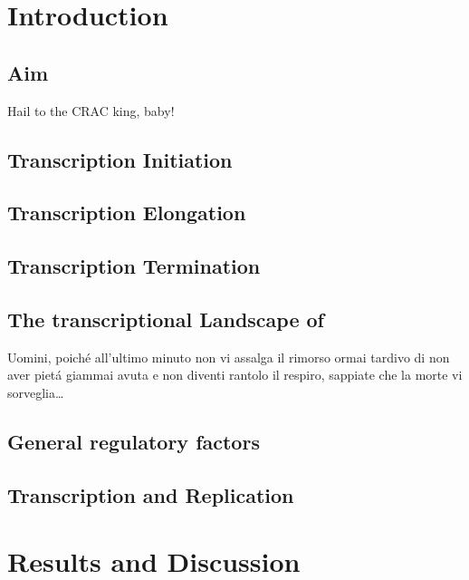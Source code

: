 \documentclass{Thesis}
\begin{document}
\frontmatter

\part{Introduction}
\chapter{Aim}
	
\begin{savequote}[70mm]
Hail to the CRAC king, baby!
\end{savequote}

\chapter{Transcription Initiation}
	
\chapter{Transcription Elongation}
	
\chapter{Transcription Termination} \label{termination}
	
\chapter{The transcriptional Landscape of \cer{}}
	
	
\begin{savequote}[70mm]
Uomini, poich\'{e} all'ultimo minuto non vi assalga il rimorso ormai tardivo di non aver piet\'{a} giammai avuta e non diventi rantolo il respiro, sappiate che la morte vi sorveglia\ldots
{} 
\end{savequote}
\chapter{General regulatory factors}
	

\chapter{Transcription and Replication}
	


\part{Results and Discussion}
	
%	
%	




\singlespacing


\end{document}
